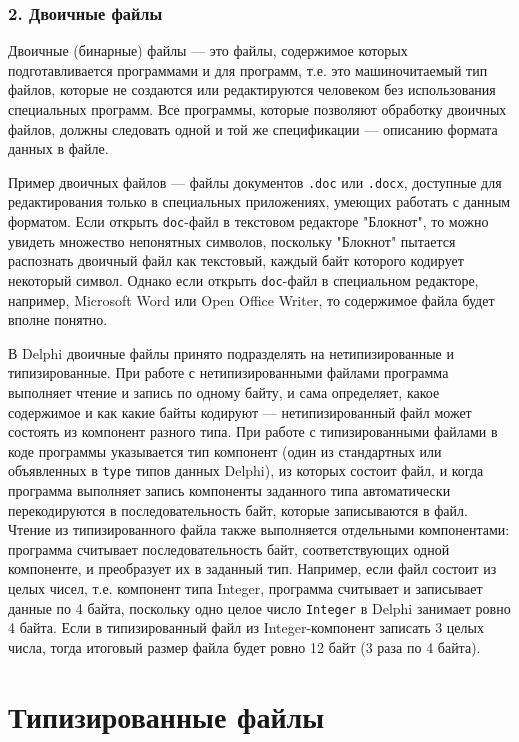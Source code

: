 \documentclass[10pt,a4paper]{report}
\begin{document}
\subsubsection*{2. Двоичные файлы}
Двоичные (бинарные) файлы --- это файлы, содержимое которых подготавливается программами и для программ, т.е. это машиночитаемый тип файлов, которые не создаются или редактируются человеком без использования специальных программ. Все программы, которые позволяют обработку двоичных файлов, должны следовать одной и той же спецификации --- описанию формата данных в файле.

Пример двоичных файлов --- файлы документов \texttt{.doc} или \texttt{.docx}, доступные для редактирования только в специальных приложениях, умеющих работать с данным форматом. Если открыть \texttt{doc}-файл в текстовом редакторе "Блокнот", то можно увидеть множество непонятных символов, поскольку "Блокнот" пытается распознать двоичный файл как текстовый, каждый байт которого кодирует некоторый символ. Однако если открыть \texttt{doc}-файл в специальном редакторе, например, Microsoft Word или Open Office Writer, то содержимое файла будет вполне понятно.

В Delphi двоичные файлы принято подразделять на нетипизированные и типизированные. При работе с нетипизированными файлами программа выполняет чтение и запись по одному байту, и сама определяет, какое содержимое и как какие байты кодируют --- нетипизированный файл может состоять из компонент разного типа. При работе с типизированными файлами в коде программы указывается тип компонент (один из стандартных или объявленных в \texttt{type} типов данных Delphi), из которых состоит файл, и когда программа выполняет запись компоненты заданного типа автоматически перекодируются в последовательность байт, которые записываются в файл. Чтение из типизированного файла также выполняется отдельными компонентами: программа считывает последовательность байт, соответствующих одной компоненте, и преобразует их в заданный тип. Например, если файл состоит из целых чисел, т.е. компонент типа Integer, программа считывает и записывает данные по 4 байта, поскольку одно целое число \texttt{Integer} в Delphi занимает ровно 4 байта. Если в типизированный файл из Integer-компонент записать 3 целых числа, тогда итоговый размер файла будет ровно 12 байт (3 раза по 4 байта).

\clearpage
\section*{Типизированные файлы}
\end{document}
